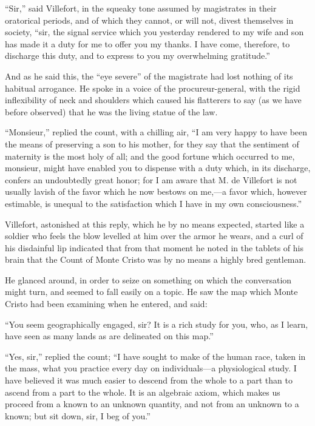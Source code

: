 “Sir,” said Villefort, in the squeaky tone assumed by magistrates in
their oratorical periods, and of which they cannot, or will not, divest
themselves in society, “sir, the signal service which you yesterday
rendered to my wife and son has made it a duty for me to offer you my
thanks. I have come, therefore, to discharge this duty, and to express
to you my overwhelming gratitude.”

And as he said this, the “eye severe” of the magistrate had lost
nothing of its habitual arrogance. He spoke in a voice of the
procureur-general, with the rigid inflexibility of neck and shoulders
which caused his flatterers to say (as we have before observed) that he
was the living statue of the law.

“Monsieur,” replied the count, with a chilling air, “I am very happy to
have been the means of preserving a son to his mother, for they say
that the sentiment of maternity is the most holy of all; and the good
fortune which occurred to me, monsieur, might have enabled you to
dispense with a duty which, in its discharge, confers an undoubtedly
great honor; for I am aware that M. de Villefort is not usually lavish
of the favor which he now bestows on me,—a favor which, however
estimable, is unequal to the satisfaction which I have in my own
consciousness.”

Villefort, astonished at this reply, which he by no means expected,
started like a soldier who feels the blow levelled at him over the
armor he wears, and a curl of his disdainful lip indicated that from
that moment he noted in the tablets of his brain that the Count of
Monte Cristo was by no means a highly bred gentleman.

He glanced around, in order to seize on something on which the
conversation might turn, and seemed to fall easily on a topic. He saw
the map which Monte Cristo had been examining when he entered, and
said:

“You seem geographically engaged, sir? It is a rich study for you, who,
as I learn, have seen as many lands as are delineated on this map.”

“Yes, sir,” replied the count; “I have sought to make of the human
race, taken in the mass, what you practice every day on individuals—a
physiological study. I have believed it was much easier to descend from
the whole to a part than to ascend from a part to the whole. It is an
algebraic axiom, which makes us proceed from a known to an unknown
quantity, and not from an unknown to a known; but sit down, sir, I beg
of you.”

